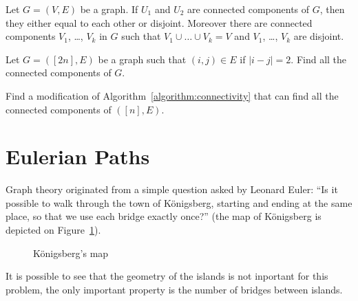 \begin{theorem}
  Let $G = (V, E)$ be a graph.
  If $U_1$ and $U_2$ are connected components of $G$, then they
  either equal to each other or disjoint.
  Moreover there are connected components
  $V_1$, \dots, $V_k$ in $G$ such that $V_1 \cup \dots \cup V_k = V$
  and $V_1$, \dots, $V_k$ are disjoint.
\end{theorem}

\begin{exercise}
  Let $G = ([2n], E)$ be a graph such that $(i, j) \in E$ if $|i - j| = 2$.
  Find all the connected components of $G$.
\end{exercise}

\begin{exercise}
  Find a modification of Algorithm~\ref{algorithm:connectivity}
  that can find all the connected components of $([n], E)$.
\end{exercise}

\section{Eulerian Paths}

Graph theory originated from a simple question asked by Leonard Euler:
``Is it possible to walk through the town of K\"{o}nigsberg, starting and
ending at the same place, so that we use each bridge exactly once?'' (the map of K\"{o}nigsberg is depicted on Figure~\ref{figure:konigsberg}).
\begin{figure}
  \begin{center}
  \end{center}
  \caption{K\"{o}nigsberg's map}
  \label{figure:konigsberg}
\end{figure}
It is possible to see that the geometry of the islands is not inportant for
this problem, the only important property is the number of bridges between
islands.

